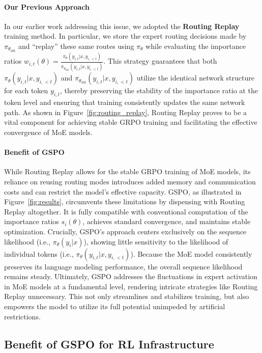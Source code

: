\paragraph{Our Previous Approach} In our earlier work addressing this issue, we adopted the \textbf{Routing Replay} training method. In particular, we store the expert routing decisions made by $\pi_{\theta_\text{old}}$ and ``replay'' these same routes using $\pi_{\theta}$ while evaluating the importance ratios $w_{i,t}(\theta) = \frac{ \pi_{\theta} (y_{i,t} | x, y_{i,<t}) }{ \pi_{\theta_\text{old}} (y_{i,t} | x,y_{i,<t})}$. This strategy guarantees that both $\pi_{\theta} (y_{i,t} | x, y_{i,<t})$ and $\pi_{\theta_\text{old}} (y_{i,t} | x,y_{i,<t})$ utilize the identical network structure for each token $y_{i,t}$, thereby preserving the stability of the importance ratio at the token level and ensuring that training consistently updates the same network path. As shown in Figure~\ref{fig:routing_replay}, Routing Replay proves to be a vital component for achieving stable GRPO training and facilitating the effective convergence of MoE models.

\paragraph{Benefit of GSPO} While Routing Replay allows for the stable GRPO training of MoE models, its reliance on reusing routing modes introduces added memory and communication costs and can restrict the model's effective capacity. GSPO, as illustrated in Figure~\ref{fig:results}, circumvents these limitations by dispensing with Routing Replay altogether. It is fully compatible with conventional computation of the importance ratios $s_i(\theta)$, achieves standard convergence, and maintains stable optimization. Crucially, GSPO’s approach centers exclusively on the sequence likelihood (i.e., $\pi_{\theta} (y_i | x)$), showing little sensitivity to the likelihood of individual tokens (i.e., $\pi_{\theta} (y_{i,t} | x, y_{i,<t})$). Because the MoE model consistently preserves its language modeling performance, the overall sequence likelihood remains steady. Ultimately, GSPO addresses the fluctuations in expert activation in MoE models at a fundamental level, rendering intricate strategies like Routing Replay unnecessary. This not only streamlines and stabilizes training, but also empowers the model to utilize its full potential unimpeded by artificial restrictions.

\subsection{Benefit of GSPO for RL Infrastructure}

